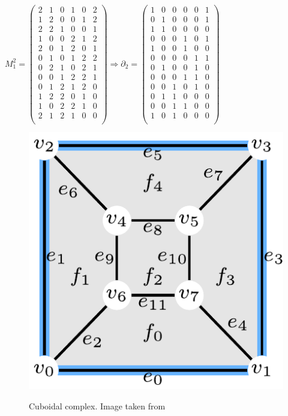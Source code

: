 $M^{2}_{1} =
\begin{pmatrix}
2 & 1 & 0 & 1 & 0 & 2\\
1 & 2 & 0 & 0 & 1 & 2\\
2 & 2 & 1 & 0 & 0 & 1\\
1 & 0 & 0 & 2 & 1 & 2\\
2 & 0 & 1 & 2 & 0 & 1\\
0 & 1 & 0 & 1 & 2 & 2\\
0 & 2 & 1 & 0 & 2 & 1\\
0 & 0 & 1 & 2 & 2 & 1\\
0 & 1 & 2 & 1 & 2 & 0\\
1 & 2 & 2 & 0 & 1 & 0\\
1 & 0 & 2 & 2 & 1 & 0\\
2 & 1 & 2 & 1 & 0 & 0\\
\end{pmatrix}
\Rightarrow \partial_{2} = 
\begin{pmatrix}
1 & 0 & 0 & 0 & 0 & 1\\
0 & 1 & 0 & 0 & 0 & 1\\
1 & 1 & 0 & 0 & 0 & 0\\
0 & 0 & 0 & 1 & 0 & 1\\
1 & 0 & 0 & 1 & 0 & 0\\
0 & 0 & 0 & 0 & 1 & 1\\
0 & 1 & 0 & 0 & 1 & 0\\
0 & 0 & 0 & 1 & 1 & 0\\
0 & 0 & 1 & 0 & 1 & 0\\
0 & 1 & 1 & 0 & 0 & 0\\
0 & 0 & 1 & 1 & 0 & 0\\
1 & 0 & 1 & 0 & 0 & 0\\
\end{pmatrix}$
\begin{figure}[htb] %
   \centering
   \includegraphics[width=0.35\linewidth]{images/boundaryExample.png}\\
   \caption[Cuboidal complex]{Cuboidal complex. Image taken from \cite{DiCarlo}}
   \label{fig:boundaryExample}
\end{figure}